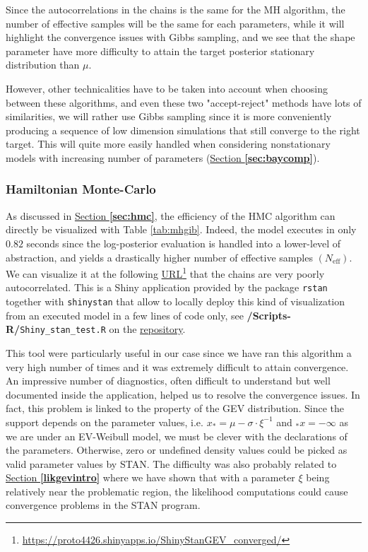 Since the autocorrelations in the chains is the same for the MH algorithm, the number of effective samples will be the same for each parameters, while it will highlight the convergence issues with Gibbs sampling, and we see that the shape parameter have more difficulty to attain the target posterior stationary distribution than $\mu$.

However, other technicalities have to be taken into account when choosing between these algorithms,  and even these two "accept-reject" methods have lots of similarities, we will rather use Gibbs sampling since it is more conveniently producing a sequence of low dimension simulations that still converge to the right target. This will quite more easily handled when considering nonstationary models with increasing number of parameters (\hyperref[sec:baycomp]{Section \textbf{\ref{sec:baycomp}}}).

 \subsubsection*{Hamiltonian Monte-Carlo}

As discussed in \hyperref[sec:hmc]{Section \textbf{\ref{sec:hmc}}}, the efficiency of the HMC algorithm can directly be visualized with Table \ref{tab:mhgib}. Indeed, the model executes in only $0.82$ seconds since the log-posterior evaluation is handled into a lower-level of abstraction, and yields a drastically higher number of effective samples $(N_{\text{eff}})$. We can visualize it at the following \href{https://proto4426.shinyapps.io/ShinyStanGEV_converged/}{URL}\footnote{\url{https://proto4426.shinyapps.io/ShinyStanGEV_converged/}} that the chains are very poorly autocorrelated. This is a Shiny application provided by the package \texttt{rstan} together with \texttt{shinystan} that allow to locally deploy this kind of visualization from an executed model in a few lines of code only, see \textbf{/Scripts-R/}\texttt{Shiny\_stan\_test.R} on the \href{https://github.com/proto4426/PissoortThesis/}{repository}. 

This tool were particularly useful in our case since we have ran this algorithm a very high number of times and it was extremely difficult to attain convergence. 
An impressive number of diagnostics, often difficult to understand but well documented inside the application, helped us to resolve the convergence issues. In fact, this problem is linked to the property of the GEV distribution. Since the support depends on the parameter values, i.e. $x_*=\mu-\sigma\cdot\xi^{-1}$ and $_*x=-\infty$ as we are under an EV-Weibull model, we must be clever with the declarations of the parameters. Otherwise, zero or undefined density values could be picked as valid parameter values by STAN. The difficulty was also probably related to \hyperref[likgevintro]{Section \textbf{\ref{likgevintro}}} where we have shown that with a parameter $\xi$ being relatively near the problematic region, the likelihood computations could cause convergence problems in the STAN program. 


